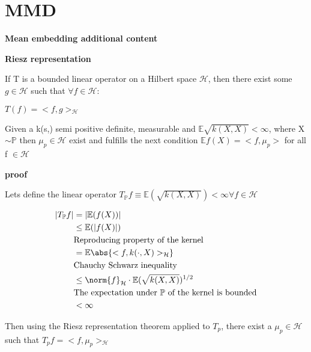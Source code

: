 \section{MMD\label{P:MMD}}
\textbf{Mean embedding additional content}
\begin{defn}
\textsf{\textbf{Riesz representation}}
\begin{flushleft}
If T is a bounded linear operator on a Hilbert space $\mathcal{H}$, then there exist some $g \in \mathcal{H}$ such that $\forall f \in \mathcal{H}$:
\end{flushleft}
\begin{center}
$T(f) = <f,g>_{\mathcal{H}}$
\end{center}
\end{defn}

\begin{lem}
Given a k(s,) semi positive definite, measurable and $\mathbb{E}\sqrt{k(X,X)}<\infty$, where X$\sim \mathbb{P}$ then $\mu_{p} \in \mathcal{H}$ exist and fulfills the next condition
$\mathbb{E}f(X) = <f,\mu_{p}>$ for all f $\in \mathcal{H}$
\end{lem}
\textbf{proof}

Lets define the linear operator $T_{\mathbb{P}}f\equiv\mathbb{E}(\sqrt{k(X,X)}) < \infty \forall f\in \mathcal{H}$ 
\begin{flushleft}

\begin{equation}{}
\begin{split}
|T_{\mathbb{P}}f| 
&= |\mathbb{E}(f(X))| \\
&\leq \mathbb{E}(|f(X)|)\\
&\text{Reproducing property of the kernel} \\
&=\mathbb{E}\abs{<f,k(\cdot,X)>_{\mathcal{H}}}\\
&\text{Chauchy Schwarz inequality} \\
&\leq \norm{f} _{\mathcal{H}}\cdot\mathbb{E}(\sqrt{k(X,X)})^{1/2}\\
&\text{The expectation under $\mathbb{P}$ of the kernel is bounded} \\
&<\infty 
\end{split}
\end{equation}

\end{flushleft}


Then using the Riesz representation theorem applied to $T_{p}$, there exist a $\mu_{p}\in \mathcal{H}$ such that $T_{p}f = <f,\mu_{p}>_{\mathcal{H}}$
\newpage

